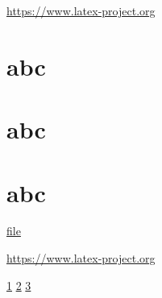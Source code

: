 \documentclass{article}
\begin{document}
\url{https://www.latex-project.org}

\section{abc}\label{sec}

\section{abc}\label{sec2}

\section{abc}\label{sec3}

\href{example-image.pdf}{file}

\newpage

\url{https://www.latex-project.org}


\ref{sec} \quad  \ref{sec2} \quad \ref{sec3}
\newpage
\end{document}
